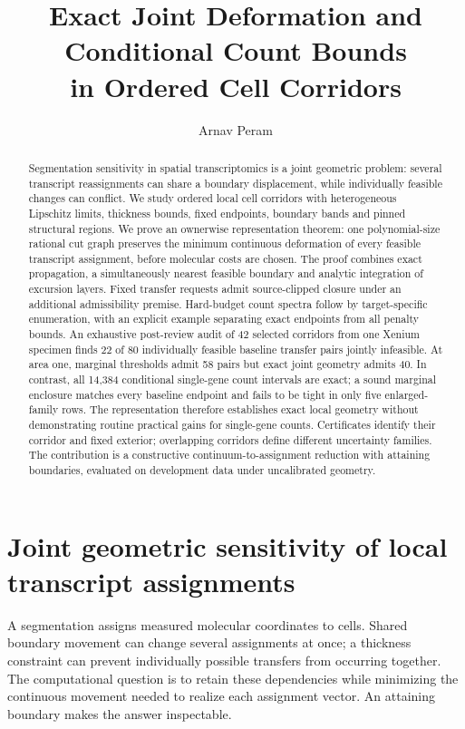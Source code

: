 \documentclass[10pt,letterpaper]{article}
\title{Exact Joint Deformation and Conditional Count Bounds\\ in Ordered Cell Corridors}
\author{Arnav Peram}
\date{}
\begin{document}
\maketitle
\begin{abstract}\normalsize
Segmentation sensitivity in spatial transcriptomics is a joint geometric problem: several transcript reassignments can share a boundary displacement, while individually feasible changes can conflict. We study ordered local cell corridors with heterogeneous Lipschitz limits, thickness bounds, fixed endpoints, boundary bands and pinned structural regions. We prove an ownerwise representation theorem: one polynomial-size rational cut graph preserves the minimum continuous deformation of every feasible transcript assignment, before molecular costs are chosen. The proof combines exact propagation, a simultaneously nearest feasible boundary and analytic integration of excursion layers. Fixed transfer requests admit source-clipped closure under an additional admissibility premise. Hard-budget count spectra follow by target-specific enumeration, with an explicit example separating exact endpoints from all penalty bounds. An exhaustive post-review audit of 42 selected corridors from one Xenium specimen finds 22 of 80 individually feasible baseline transfer pairs jointly infeasible. At area one, marginal thresholds admit 58 pairs but exact joint geometry admits 40. In contrast, all 14,384 conditional single-gene count intervals are exact; a sound marginal enclosure matches every baseline endpoint and fails to be tight in only five enlarged-family rows. The representation therefore establishes exact local geometry without demonstrating routine practical gains for single-gene counts. Certificates identify their corridor and fixed exterior; overlapping corridors define different uncertainty families. The contribution is a constructive continuum-to-assignment reduction with attaining boundaries, evaluated on development data under uncalibrated geometry.
\end{abstract}
\thispagestyle{empty}\hypersetup{pageanchor=false}
\clearpage\setcounter{page}{1}\hypersetup{pageanchor=true}

\section{Joint geometric sensitivity of local transcript assignments}
A segmentation assigns measured molecular coordinates to cells. Shared boundary movement can change several assignments at once; a thickness constraint can prevent individually possible transfers from occurring together. The computational question is to retain these dependencies while minimizing the continuous movement needed to realize each assignment vector. An attaining boundary makes the answer inspectable.
\end{document}
